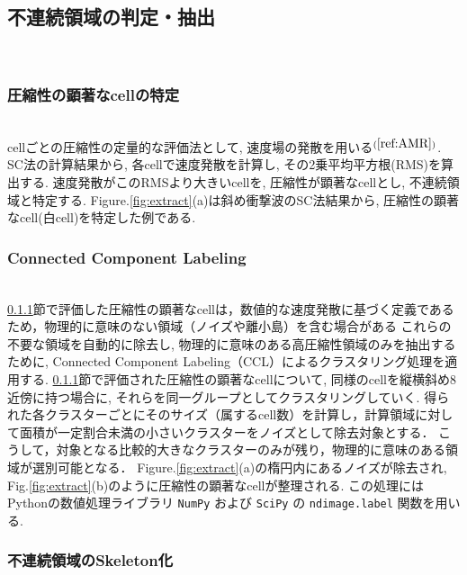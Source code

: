 \documentclass[a4j]{jarticle}
\begin{document}
\subsection{不連続領域の判定・抽出} \label{subsec:discon}
\mbox{}\\[-6.0ex]
\subsubsection{圧縮性の顕著なcellの特定} \label{subsubsec:comp}
\mbox{}\\[-1.0ex]

cellごとの圧縮性の定量的な評価法として, 速度場の発散を用いる$^{(\ref{ref:AMR})}$.
SC法の計算結果から, 各cellで速度発散を計算し, その2乗平均平方根(RMS)を算出する.
速度発散がこのRMSより大きいcellを, 圧縮性が顕著なcellとし, 不連続領域と特定する.
Figure.\ref{fig:extract}(a)は斜め衝撃波のSC法結果から, 圧縮性の顕著なcell(白cell)を特定した例である.

\subsubsection{Connected Component Labeling}\label{subsubsec:CCL}
\mbox{}\\[-1.0ex]

\ref{subsubsec:comp}節で評価した圧縮性の顕著なcellは，数値的な速度発散に基づく定義であるため，物理的に意味のない領域（ノイズや離小島）を含む場合がある
これらの不要な領域を自動的に除去し, 物理的に意味のある高圧縮性領域のみを抽出するために, Connected Component Labeling（CCL）によるクラスタリング処理を適用する.
\ref{subsubsec:comp}節で評価された圧縮性の顕著なcellについて, 同様のcellを縦横斜め8近傍に持つ場合に, それらを同一グループとしてクラスタリングしていく.
得られた各クラスターごとにそのサイズ（属するcell数）を計算し，計算領域に対して面積が一定割合未満の小さいクラスターをノイズとして除去対象とする．
こうして，対象となる比較的大きなクラスターのみが残り，物理的に意味のある領域が選別可能となる．
Figure.\ref{fig:extract}(a)の楕円内にあるノイズが除去され, Fig.\ref{fig:extract}(b)のように圧縮性の顕著なcellが整理される.
この処理にはPythonの数値処理ライブラリ \texttt{NumPy} および \texttt{SciPy} の \texttt{ndimage.label} 関数を用いる.

\subsubsection{不連続領域のSkeleton化} \label{subsubsec:skeleton}
\mbox{}\\[-1.0ex]
\end{document}
